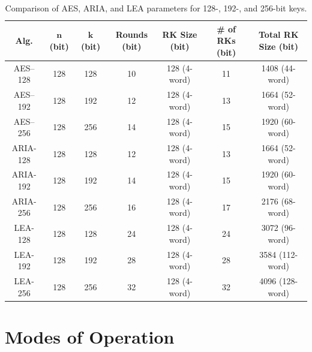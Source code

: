 \documentclass[11pt,a4paper]{report}
\theoremstyle{definitionstyle}
\begin{document}
\begin{table}[h!]
	\centering{}
	\begin{tabular*}{\textwidth}{@{\extracolsep{\fill}}ccccccc}
		\hline
		\textbf{Alg.} & $\boldsymbol{n}$ (bit) & $\boldsymbol{k}$ (bit) & \textbf{Rounds} (bit) & \textbf{RK Size} (bit) & \textbf{\# of RKs} (bit) & \textbf{Total RK Size} (bit) \\
		\hline
		\textsf{AES--128} & 128 & 128 & 10 & 128 (4-word) & 11 & 1408 (44-word) \\
		\textsf{AES--192} & 128 & 192 & 12 & 128 (4-word) & 13 & 1664 (52-word)\\
		\textsf{AES--256} & 128 & 256 & 14 & 128 (4-word) & 15 & 1920 (60-word)\\
		\hline
		\textsf{ARIA-128} & 128 & 128 & 12 & 128 (4-word) & 13 & 1664 (52-word)\\
		\textsf{ARIA-192} & 128 & 192 & 14 & 128 (4-word) & 15 & 1920 (60-word)\\
		\textsf{ARIA-256} & 128 & 256 & 16 & 128 (4-word) & 17 & 2176 (68-word)\\
		\hline
		\textsf{LEA-128} & 128 & 128 & 24 & 128 (4-word) & 24 & 3072 (96-word)\\
		\textsf{LEA-192} & 128 & 192 & 28 & 128 (4-word) & 28 & 3584 (112-word)\\
		\textsf{LEA-256} & 128 & 256 & 32 & 128 (4-word) & 32 & 4096 (128-word)\\
		\hline
	\end{tabular*}
	\caption{Comparison of AES, ARIA, and LEA parameters for 128-, 192-, and 256-bit keys. 
	}
	\label{tab:cipher-comparison}
\end{table}

\newpage


\section{Modes of Operation}

\end{document}
